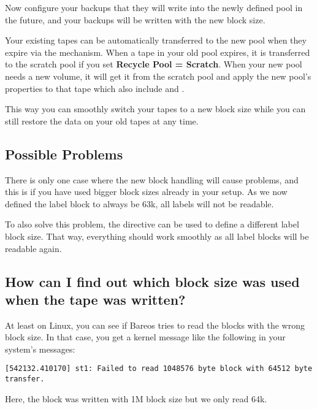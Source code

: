 
Now configure your backups that they will write into the newly defined pool in the
future, and your backups will be written with the new block size.

Your existing tapes can be automatically transferred to the new pool when they expire
via the  mechanism. When a tape in your old pool expires, it is
transferred to the scratch pool if you set
{\bf Recycle Pool = Scratch}. When your new pool needs a new volume, it will get it
from the scratch pool and apply the new pool's properties to that tape which also
include   and  .

This way you can smoothly switch your tapes to a new block size while you can still
restore the data on your old tapes at any time.

\subsection*{Possible Problems}
There is only one case where the new block handling will cause problems, and this
is if you have used bigger block sizes already in your setup. As we now defined the
label block to always be 63k, all labels will not be readable.

To also solve this problem, the directive  can be used to define
a different label block size.  That way, everything should work smoothly as all label
blocks will be readable again.


\subsection*{How can I find out which block size was used when the tape was written?}

At least on Linux, you can see if Bareos tries to read the blocks with the
wrong block size. In that case, you get a kernel message like the following in
your system's messages:
\begin{verbatim}
[542132.410170] st1: Failed to read 1048576 byte block with 64512 byte transfer.
\end{verbatim}
Here, the block was written with 1M block size but we only read 64k.

